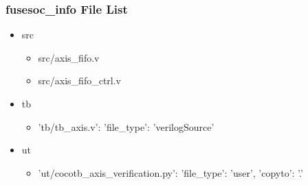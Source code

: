 \subsubsection{fusesoc\_info File List}
\begin{itemize}
\item src
	\begin{itemize}
	\item src/axis\_fifo.v
	\item src/axis\_fifo\_ctrl.v
	\end{itemize}
\item tb
	\begin{itemize}
	\item {'tb/tb\_axis.v': {'file\_type': 'verilogSource'}}
	\end{itemize}
\item ut
	\begin{itemize}
	\item {'ut/cocotb\_axis\_verification.py': {'file\_type': 'user', 'copyto': '.'}}
	\end{itemize}
\end{itemize}
